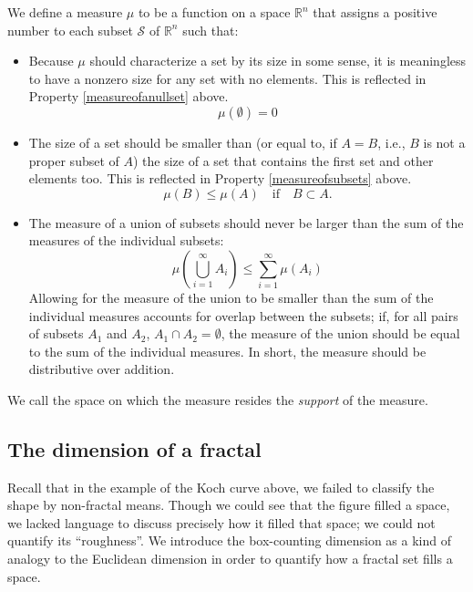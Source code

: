 \begin{mydef}
We define a measure $ \mu $ to be a function on a space $ \mathbb{R}^{n} $ that assigns a positive number to each subset $ \mathcal{S} $ of $ \mathbb{R}^{n} $ such that:

\begin{itemize}
\item Because $\mu$ should characterize a set by its size in some sense, it is meaningless to have a nonzero size for any set with no elements. This is reflected in Property \ref{measureofanullset} above.
\begin{equation}
\mu(\emptyset) = 0
\end{equation}
\item The size of a set should be smaller than (or equal to, if $ A = B $, i.e., $B$ is not a proper subset of $A$) the size of a set that contains the first set and other elements too. This is reflected in Property \ref{measureofsubsets} above.
\begin{equation}
\mu(B) \le \mu(A) \mathrm{ \quad if \quad }  B \subset A.
\end{equation} 
\item The measure of a union of subsets should never be larger than the sum of the measures of the individual subsets: 
\begin{equation}
\mu\left(\bigcup_{i=1}^{\infty} A_i\right) \le \sum_{i=1}^{\infty} \mu(A_i) 
\end{equation}
Allowing for the measure of the union to be smaller than the sum of the individual measures accounts for overlap between the subsets; if, for all pairs of subsets $A_1$ and $A_2$, $A_1 \cap A_2 = \emptyset$, the measure of the union should be equal to the sum of the individual measures. In short, the measure should be distributive over addition.
\end{itemize}
We call the space on which the measure resides the \textit{support} of the measure.
\end{mydef}

\subsection{The dimension of a fractal}
Recall that in the example of the Koch curve above, we failed to classify the shape by non-fractal means. Though we could see that the figure filled a space, we lacked language to discuss precisely how it filled that space; we could not quantify its ``roughness''. We introduce the box-counting dimension as a kind of analogy to the Euclidean dimension in order to quantify how a fractal set fills a space.


